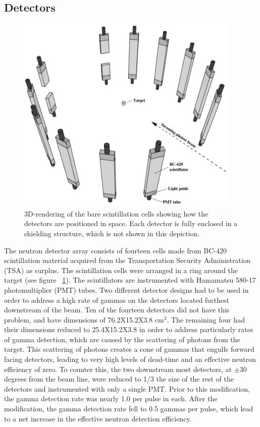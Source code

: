 \subsection{Detectors}
\begin{figure}[h]
\centering
\includegraphics[width=0.95\textwidth]{Content/Methods/Detectors.png}
\caption{3D-rendering of the bare scintillation cells showing how the detectors are positioned in space.
Each detector is fully enclosed in a shielding structure, which is not shown in this depiction.}
\label{fig:DetGeom}
\end{figure}
The neutron detector array consists of fourteen cells made from BC-420 scintillation material acquired from the Transportation Security Administration (TSA) as surplus.
The scintillation cells were arranged in a ring around the target (see figure ~\ref{fig:DetGeom}).
The scintillators are instrumented with Hamamatsu 580-17 photomultiplier (PMT) tubes.
Two different detector designs had to be used in order to address a high rate of gammas on the detectors located furthest downstream of the beam.
Ten of the fourteen detectors did not have this problem, and have dimensions of 76.2X15.2X3.8 cm$^3$.
The remaining four had their dimensions reduced to 25.4X15.2X3.8 in order to address particularly rates of gamma detection, which are caused by the scattering of photons from the target.
This scattering of photons creates a cone of gammas that engulfs forward facing detectors, leading to very high levels of dead-time and an effective neutron efficiency of zero.
To counter this, the two downstream most detectors, at $\pm$30 degrees from the beam line, were reduced to 1/3 the size of the rest of the detectors and instrumented with only a single PMT.
Prior to this modification, the gamma detection rate was nearly 1.0 per pulse in each.
After the modification, the gamma detection rate fell to 0.5 gammas per pulse, which lead to a net increase in the effective neutron detection efficiency.

